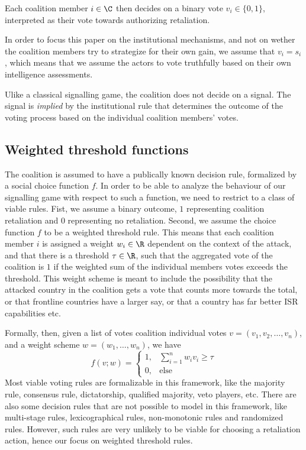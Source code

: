 Each coalition member $i\in \C$ then decides on a binary vote $v_i \in \{0,1\}$, interpreted as their vote towards authorizing retaliation. 

In order to focus this paper on the institutional mechanisms, and not on wether the coalition members try to strategize for their own gain, we assume that $v_i = s_i$, which means that we assume the actors to vote truthfully based on their own intelligence assessments. 

Ulike a classical signalling game, the coalition does not decide on a signal. The signal is \emph{implied} by the institutional rule that determines the outcome of the voting process based on the individual coalition members' votes. 

\subsection{Weighted threshold functions}

The coalition is assumed to have a publically known decision rule, formalized by a social choice function $f$. In order to be able to analyze the behaviour of our signalling game with respect to such a function, we need to restrict to a class of viable rules. Fist, we assume a binary outcome, $1$ representing coalition retaliation and $0$ representing no retaliation. Second, we assume the choice function $f$ to be a weighted threshold rule. This means that each coalition member $i$ is assigned a weight $w_i \in \R$ dependent on the context of the attack, and that there is a threshold $\tau \in \R$, such that the aggregated vote of the coalition is $1$ if the weighted sum of the individual members votes exceeds the threshold. This weight scheme is meant to include the possibility that the attacked country in the coalition gets a vote that counts more towards the total, or that frontline countries have a larger say, or that a country has far better ISR capabilities etc. 

Formally, then, given a list of votes coalition individual votes $v=(v_1, v_2, \dots, v_n)$, and a weight scheme $w=(w_1, \dots, w_n)$, we have 
\[
f(v;w) = 
\begin{cases}
    1, &\displaystyle\sum_{i=1}^n w_i v_i \geq \tau \\
    0, &\text{else}    
\end{cases}
\]
Most viable voting rules are formalizable in this framework, like the majority rule, consensus rule, dictatorship, qualified majority, veto players, etc. There are also some decision rules that are not possible to model in this framework, like multi-stage rules, lexicographical rules, non-monotonic rules and randomized rules. However, such rules are very unlikely to be viable for choosing a retaliation action, hence our focus on weighted threshold rules. 

